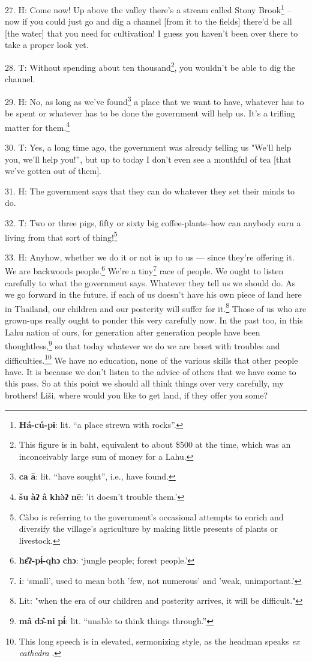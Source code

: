 27. H: Come now! Up above the valley there's a stream called Stony Brook\footnote{\textbf{Há-cú-pɨ}: lit. ``a place strewn with rocks''.} --
now if you could just go and dig a channel [from it to the fields] there'd be all
[the water] that you need for cultivation! I guess you haven't been over there
to take a proper look yet.

28. T: Without spending about ten thousand\footnote{This figure is in baht, equivalent to about \$500 at the time, which was an inconceivably large sum of money for a Lahu.}, you wouldn't be able to dig
the channel.

29. H: No, as long as we've found\footnote{\textbf{ca} \textbf{ā}: lit. ``have sought'', i.e., have found.} a place that we want to have, whatever has
to be spent or whatever has to be done the government will help us. It's a trifling
matter for them.\footnote{\textbf{šu} \textbf{àʔ} \textbf{â} \textbf{khə̀ʔ} \textbf{nē}: 'it doesn't trouble them.'}

30. T: Yes, a long time ago, the government was already telling us "We'll
help you, we'll help you!'', but up to today I don't even see a mouthful of tea
[that we've gotten out of them].

31. H: The government says that they can do whatever they set their minds to do.

32. T: Two or three pigs, fifty or sixty big coffee-plants--how can anybody
earn a living from that sort of thing!\footnote{Càbo is referring to the government's occasional attempts to enrich and diversify the village's agriculture by making little presents of plants or livestock.}

33. H: Anyhow, whether we do it or not is up to us --- since they're offering it.
We are backwoods people.\footnote{\textbf{hɛ̂ʔ-pɨ́-qhɔ} \textbf{chɔ}: `jungle people; forest people.'} We're a tiny\footnote{\textbf{i}: `small', used to mean both 'few, not numerous' and 'weak, unimportant.'} race of people. We ought to listen
carefully to what the government says. Whatever they tell us we should do. As we
go forward in the future, if each of us doesn't have his own piece of land here
in Thailand, our children and our posterity will suffer for it.\footnote{Lit: "when the era of our children and posterity arrives, it will be difficult."} Those of us
who are grown-ups really ought to ponder this very carefully now. In the past too,
in this Lahu nation of ours, for generation after generation people have been thoughtless,\footnote{\textbf{mâ} \textbf{dɔ̂-ni} \textbf{pɨ́}: lit. ``unable to think things through.''}
so that today whatever we do we are beset with troubles and difficulties.\footnote{This long speech is in elevated, sermonizing style, as the headman speaks \textit{ex cathedra }.} We
have no education, none of the various skills that other people have. It is because
we don't listen to the advice of others that we have come to this pass. So at this
point we should all think things over very carefully, my brothers! Liši, where
would you like to get land, if they offer you some?

